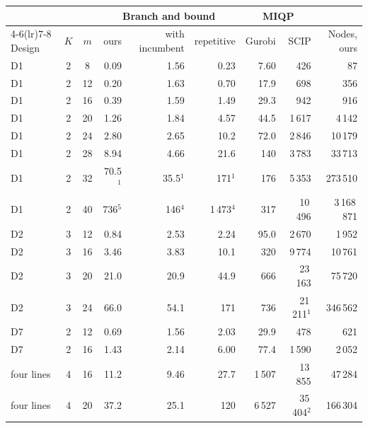 \begin{tabular}{lccrrrrrr}
\toprule
 & & & \multicolumn{3}{c}{Branch and bound} & \multicolumn{2}{c}{MIQP} & \\
\cmidrule(lr){4-6}\cmidrule(lr){7-8}
Design & $K$ & $m$ & ours & with incumbent & repetitive & Gurobi & SCIP & Nodes, ours \\
\midrule
D1 & 2 & 8 & 0.09 & 1.56 & 0.23 & 7.60 & 426 & 87 \\
D1 & 2 & 12 & 0.20 & 1.63 & 0.70 & 17.9 & 698 & 356 \\
D1 & 2 & 16 & 0.39 & 1.59 & 1.49 & 29.3 & 942 & 916 \\
D1 & 2 & 20 & 1.26 & 1.84 & 4.57 & 44.5 & 1\,617 & 4\,142 \\
D1 & 2 & 24 & 2.80 & 2.65 & 10.2 & 72.0 & 2\,846 & 10\,179 \\
D1 & 2 & 28 & 8.94 & 4.66 & 21.6 & 140 & 3\,783 & 33\,713 \\
D1 & 2 & 32 & 70.5$^{1}$ & 35.5$^{1}$ & 171$^{1}$ & 176 & 5\,353 & 273\,510 \\
D1 & 2 & 40 & 736$^{5}$ & 146$^{4}$ & 1\,473$^{4}$ & 317 & 10\,496 & 3\,168\,871 \\
D2 & 3 & 12 & 0.84 & 2.53 & 2.24 & 95.0 & 2\,670 & 1\,952 \\
D2 & 3 & 16 & 3.46 & 3.83 & 10.1 & 320 & 9\,774 & 10\,761 \\
D2 & 3 & 20 & 21.0 & 20.9 & 44.9 & 666 & 23\,163 & 75\,720 \\
D2 & 3 & 24 & 66.0 & 54.1 & 171 & 736 & 21\,211$^{1}$ & 346\,562 \\
D7 & 2 & 12 & 0.69 & 1.56 & 2.03 & 29.9 & 478 & 621 \\
D7 & 2 & 16 & 1.43 & 2.14 & 6.00 & 77.4 & 1\,590 & 2\,052 \\
four lines & 4 & 16 & 11.2 & 9.46 & 27.7 & 1\,507 & 13\,855 & 47\,284 \\
four lines & 4 & 20 & 37.2 & 25.1 & 120 & 6\,527 & 35\,404$^{2}$ & 166\,304 \\
\bottomrule
\end{tabular}